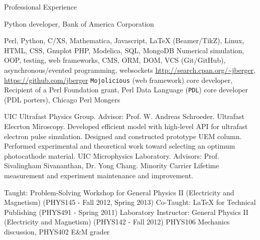 \begin{rubric}{Professional Experience}


   Python developer, Bank of America Corporation


  \entry*[Proficient in] Perl, Python, C/XS, Mathematica, Javascript, \LaTeX{} (Beamer/TikZ), Linux, HTML, CSS, Gnuplot
   PHP, Modelica, SQL, MongoDB
  \entry*[Concepts] Numerical simulation, OOP, testing, web frameworks, CMS, ORM, DOM, VCS (Git/GitHub), asynchronous/evented programming, websockets
  \entry*[Code] \url{http://search.cpan.org/~jberger}, \url{https://github.com/jberger}
  \entry*[Affiliations] \texttt{Mojolicious} (web framework) core developer, Recipient of a Perl Foundation grant, Perl Data Language (\texttt{PDL}) core developer (PDL porters), Chicago Perl Mongers
  

  \entry*[2005 --- 2013] UIC Ultrafast Physics Group. Advisor: Prof. W. Andreas Schroeder. Ultrafast Elecrton Miroscopy.
  \entry* Developed efficient model with high-level API for ultrafast electron pulse simulation. 
  \entry* Designed and constructed prototype UEM column.
  \entry* Performed experimental and theoretical work toward selecting an optimum photocathode material.
  \entry*[2003 --- 2005] UIC Microphysics Laboratory. Advisors: Prof. Sivalingham Sivananthan, Dr. Yong Chang.
  \entry* Minority Carrier Lifetime measurement and experiment maintenance and improvement.


  \entry*[Teaching] Taught: Problem-Solving Workshop for General Physics II (Electricity and Magnetism) (PHYS145 - Fall 2012, Spring 2013) 
  \entry*[Teaching] Co-Taught: \LaTeX{} for Technical Publishing (PHYS491 - Spring 2011)
  \entry*[T.A.] Laboratory Instructor: General Physics II (Electricity and Magnetism) (PHYS142 - Fall 2012)
  \entry*[T.A.] PHYS106 Mechanics discussion, PHYS402 E\&M grader

\end{rubric}
